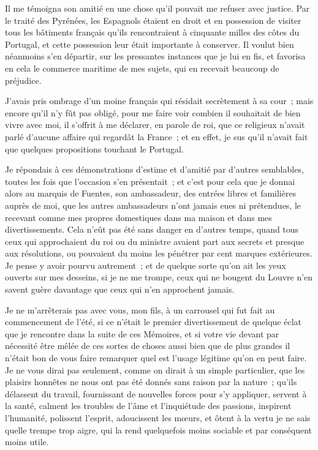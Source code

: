 \documentclass[french,twoside]{book} %
\begin{document}
Il me témoigna son amitié en une chose qu’il pouvait me refuser avec justice. Par le traité des Pyrénées, les Espagnols étaient en droit et en possession de visiter tous les bâtiments français qu’ils rencontraient à cinquante milles des côtes du Portugal, et cette possession leur était importante à conserver. Il voulut bien néanmoins s’en départir, sur les pressantes instances que je lui en fis, et favorisa en cela le commerce maritime de mes sujets, qui en recevait beaucoup de préjudice.\par
J’avais pris ombrage d’un moine français qui résidait secrètement à sa cour ; mais encore qu’il n’y fût pas obligé, pour me faire voir combien il souhaitait de bien vivre avec moi, il s’offrit à me déclarer, en parole de roi, que ce religieux n’avait parlé d’aucune affaire qui regardât la France ; et en effet, je sus qu’il n’avait fait que quelques propositions touchant le Portugal.\par
Je répondais à ces démonstrations d’estime et d’amitié par d’autres semblables, toutes les fois que l’occasion s’en présentait ; et c’est pour cela que je donnai alors au marquis de Fuentes, son ambassadeur, des entrées libres et familières auprès de moi, que les autres ambassadeurs n’ont jamais eues ni prétendues, le recevant comme mes propres domestiques dans ma maison et dans mes divertissements. Cela n’eût pas été sans danger en d’autres temps, quand tous ceux qui approchaient du roi ou du ministre avaient part aux secrets et presque aux résolutions, ou pouvaient du moins les pénétrer par cent marques extérieures. Je pense y avoir pourvu autrement ; et de quelque sorte qu’on ait les yeux ouverts sur mes desseins, si je ne me trompe, ceux qui ne bougent du Louvre n’en savent guère davantage que ceux qui n’en approchent jamais.\par
Je ne m’arrêterais pas avec vous, mon fils, à un carrousel qui fut fait au commencement de l’été, si ce n’était le premier divertissement de quelque éclat que je rencontre dans la suite de ces Mémoires, et si votre vie devant par nécessité être mêlée de ces sortes de choses aussi bien que de plus grandes il n’était bon de vous faire remarquer quel est l’usage légitime qu’on en peut faire. Je ne vous dirai pas seulement, comme on dirait à un simple particulier, que les plaisirs honnêtes ne nous ont pas été donnés sans raison par la nature ; qu’ils délassent du travail, fournissant de nouvelles forces pour s’y appliquer, servent à la santé, calment les troubles de l’âme et l’inquiétude des passions, inspirent l’humanité, polissent l’esprit, adoucissent les mœurs, et ôtent à la vertu je ne sais quelle trempe trop aigre, qui la rend quelquefois moins sociable et par conséquent moins utile.\par
\end{document}
